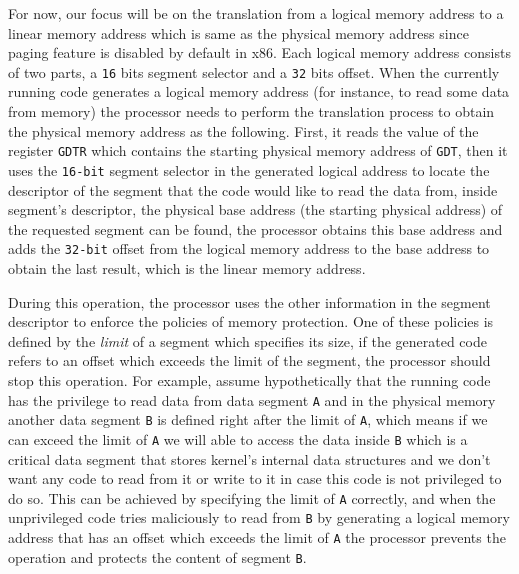For now, our focus will be on the translation from a logical memory
address to a linear memory address which is same as the physical memory
address since paging feature is disabled by default in x86. Each logical
memory address consists of two parts, a \lstinline!16! bits segment
selector and a \lstinline!32! bits offset. When the currently running
code generates a logical memory address (for instance, to read some data
from memory) the processor needs to perform the translation process to
obtain the physical memory address as the following. First, it reads the
value of the register \lstinline!GDTR! which contains the starting
physical memory address of \lstinline!GDT!, then it uses the
\lstinline!16-bit! segment selector in the generated logical address to
locate the descriptor of the segment that the code would like to read
the data from, inside segment's descriptor, the physical base address
(the starting physical address) of the requested segment can be found,
the processor obtains this base address and adds the \lstinline!32-bit!
offset from the logical memory address to the base address to obtain the
last result, which is the linear memory address.

During this operation, the processor uses the other information in the
segment descriptor to enforce the policies of memory protection. One of
these policies is defined by the \emph{limit} of a segment which
specifies its size, if the generated code refers to an offset which
exceeds the limit of the segment, the processor should stop this
operation. For example, assume hypothetically that the running code has
the privilege to read data from data segment \lstinline!A! and in the
physical memory another data segment \lstinline!B! is defined right
after the limit of \lstinline!A!, which means if we can exceed the limit
of \lstinline!A! we will able to access the data inside \lstinline!B!
which is a critical data segment that stores kernel's internal data
structures and we don't want any code to read from it or write to it in
case this code is not privileged to do so. This can be achieved by
specifying the limit of \lstinline!A! correctly, and when the
unprivileged code tries maliciously to read from \lstinline!B! by
generating a logical memory address that has an offset which exceeds the
limit of \lstinline!A! the processor prevents the operation and protects
the content of segment \lstinline!B!.


